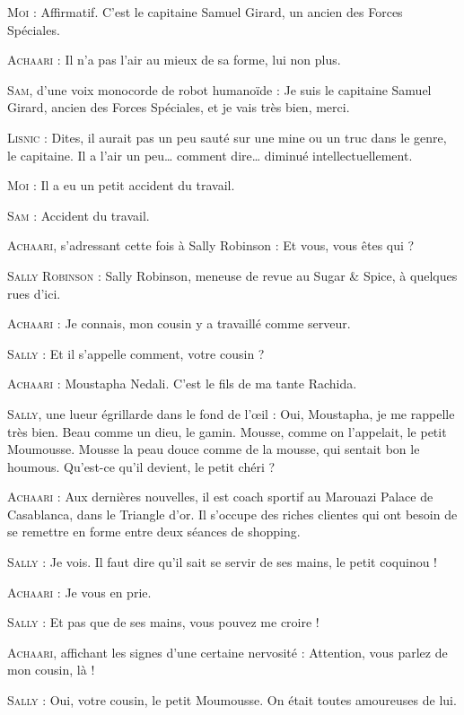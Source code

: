 \begin{dialogue}

\textsc{Moi} : Affirmatif. C’est le capitaine Samuel Girard, un ancien des Forces Spéciales.

\textsc{Achaari} : Il n’a pas l’air au mieux de sa forme, lui non plus.

\textsc{Sam}, d’une voix monocorde de robot humanoïde : Je suis le capitaine Samuel Girard, ancien des Forces Spéciales, et je vais très bien, merci.

\textsc{Lisnic} : Dites, il aurait pas un peu sauté sur une mine ou un truc dans le genre, le capitaine. Il a l’air un peu… comment dire… diminué intellectuellement.

\textsc{Moi} : Il a eu un petit accident du travail.

\textsc{Sam} : Accident du travail.

\textsc{Achaari}, s’adressant cette fois à Sally Robinson : Et vous, vous êtes qui ?

\textsc{Sally Robinson} : Sally Robinson, meneuse de revue au Sugar \& Spice, à quelques rues d’ici.

\textsc{Achaari} : Je connais, mon cousin y a travaillé comme serveur. 

\textsc{Sally} : Et il s’appelle comment, votre cousin ?

\textsc{Achaari} : Moustapha Nedali. C’est le fils de ma tante Rachida.

\textsc{Sally}, une lueur égrillarde dans le fond de l’œil : Oui, Moustapha, je me rappelle très bien. Beau comme un dieu, le gamin. Mousse, comme on l’appelait, le petit Moumousse. Mousse la peau douce comme de la mousse, qui sentait bon le houmous. Qu’est-ce qu’il devient, le petit chéri ?

\textsc{Achaari} : Aux dernières nouvelles, il est coach sportif au Marouazi Palace de Casablanca, dans le Triangle d’or. Il s’occupe des riches clientes qui ont besoin de se remettre en forme entre deux séances de shopping.

\textsc{Sally} : Je vois. Il faut dire qu’il sait se servir de ses mains, le petit coquinou !

\textsc{Achaari} : Je vous en prie.

\textsc{Sally} : Et pas que de ses mains, vous pouvez me croire !

\textsc{Achaari}, affichant les signes d’une certaine nervosité : Attention, vous parlez de mon cousin, là !

\textsc{Sally} : Oui, votre cousin, le petit Moumousse. On était toutes amoureuses de lui.


\end{dialogue}
